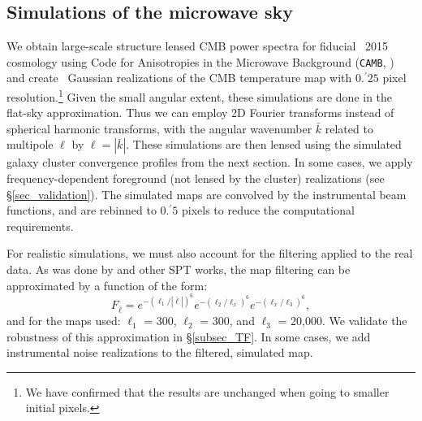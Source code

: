 \documentclass[usenatbib, twocolumn, nofootinbib, reprint]{aastex61}
\begin{document}
\subsection{Simulations of the microwave sky}



We obtain large-scale structure lensed CMB power spectra for fiducial \planck\ 2015 cosmology \citep{planck15-13} using Code for Anisotropies in the Microwave Background (\texttt{CAMB}, %
\citealt{lewis00}) and create \boxsize\ Gaussian realizations of the CMB temperature map with $0.^{\prime}25$ pixel resolution.\footnote{We have confirmed that the results are unchanged when going to smaller initial pixels.}
Given the small angular extent, these simulations are done in the flat-sky approximation. 
Thus we can employ 2D Fourier transforms instead of spherical harmonic transforms, with the angular wavenumber $\bar{k}$ related to multipole $\ell$ by $\ell = |\bar{k}|$. 
These simulations are then lensed using the simulated galaxy cluster convergence profiles from the next section. 
In some cases, we apply frequency-dependent foreground (not lensed by the cluster) realizations (see \S\ref{sec_validation}). 
The simulated maps are convolved by the instrumental beam functions, and are rebinned to $0.^{\prime}5$ pixels to reduce the computational requirements. 

For realistic simulations, we must also account for the filtering applied to the real data. 
As was done by  and other SPT works, the map filtering can be approximated by a function of the form:
\begin{equation}
F_{\bar{\ell}} = e^{-(\ell_{1}/|\bar{\ell}|)^{6}}  e^{-(\ell_{2}/\ell_{x})^{6}} e^{-(\ell_{x}/\ell_{3})^{6}},
\label{eq_filter_TF}
\end{equation}
and for the maps used: $\ell_{1}$ = 300, $\ell_{2}$ = 300, and $\ell_{3}$ = 20,000. 
We validate the robustness of this approximation in \S\ref{subsec_TF}.
In some cases, we add instrumental noise realizations to the filtered, simulated map. 

\end{document}
